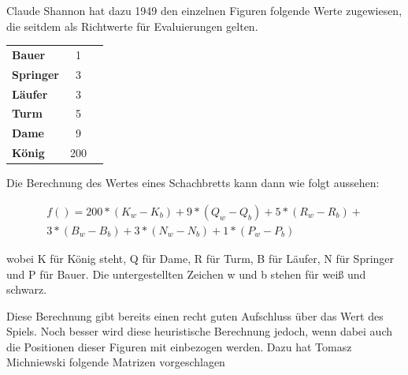 Claude Shannon hat dazu 1949 den einzelnen Figuren folgende Werte zugewiesen, die seitdem als Richtwerte für Evaluierungen gelten.

\begin{tabular}{ l c r }
  \textbf{Bauer} & 1\\
  \textbf{Springer} & 3 \\
  \textbf{Läufer} & 3 \\
  \textbf{Turm} & 5 \\
  \textbf{Dame} & 9 \\
  \textbf{König} & 200
\end{tabular}


Die Berechnung des Wertes eines Schachbretts kann dann wie folgt aussehen:

\begin{equation}
\begin{aligned}
f() = 200*(K_w-K_b) + 9*(Q_w-Q_b) + 5*(R_w-R_b) + \\3*(B_w-B_b) + 3*(N_w-N_b) + 1*(P_w-P_b)
\end{aligned}
\end{equation}


wobei K für König steht, Q für Dame, R für Turm, B für Läufer, N für Springer und P für Bauer. Die untergestellten Zeichen w und b stehen für weiß und schwarz.

Diese Berechnung gibt bereits einen recht guten Aufschluss über das Wert des Spiels. Noch besser wird diese heuristische Berechnung jedoch, wenn dabei auch die Positionen dieser Figuren mit einbezogen werden. Dazu hat Tomasz Michniewski folgende Matrizen vorgeschlagen

